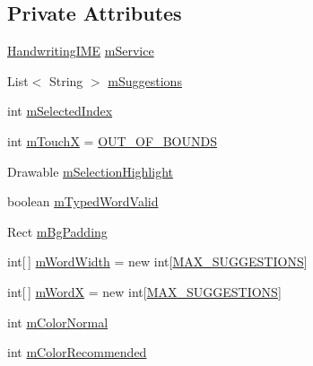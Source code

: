 \subsection*{Private Attributes}
\begin{DoxyCompactItemize}
\item 
\hyperlink{classch_1_1zhaw_1_1ba10__bsha__1_1_1ime_1_1HandwritingIME}{HandwritingIME} \hyperlink{classch_1_1zhaw_1_1ba10__bsha__1_1_1ime_1_1CandidateView_a0d884c9d53fd9e83c4f07227d64d0e4a}{mService}
\item 
List$<$ String $>$ \hyperlink{classch_1_1zhaw_1_1ba10__bsha__1_1_1ime_1_1CandidateView_a3e227667ae0295c1e7f36d55342bc8bd}{mSuggestions}
\item 
int \hyperlink{classch_1_1zhaw_1_1ba10__bsha__1_1_1ime_1_1CandidateView_a056a5bbf219465c88152d1c77a9bfd5d}{mSelectedIndex}
\item 
int \hyperlink{classch_1_1zhaw_1_1ba10__bsha__1_1_1ime_1_1CandidateView_af8a46c24bf29d609f187c805b7e0975c}{mTouchX} = \hyperlink{classch_1_1zhaw_1_1ba10__bsha__1_1_1ime_1_1CandidateView_a9315efa15e2f117b2253fc55d3d1912d}{OUT\_\-OF\_\-BOUNDS}
\item 
Drawable \hyperlink{classch_1_1zhaw_1_1ba10__bsha__1_1_1ime_1_1CandidateView_a4242253fd23317c3e023553f91199268}{mSelectionHighlight}
\item 
boolean \hyperlink{classch_1_1zhaw_1_1ba10__bsha__1_1_1ime_1_1CandidateView_a2283ffd5b861d5fa11e315f499b247f5}{mTypedWordValid}
\item 
Rect \hyperlink{classch_1_1zhaw_1_1ba10__bsha__1_1_1ime_1_1CandidateView_afb3141192119d59855386a531991a9e0}{mBgPadding}
\item 
int\mbox{[}$\,$\mbox{]} \hyperlink{classch_1_1zhaw_1_1ba10__bsha__1_1_1ime_1_1CandidateView_a88507b3d2c0823b5b3ab79799af801a3}{mWordWidth} = new int\mbox{[}\hyperlink{classch_1_1zhaw_1_1ba10__bsha__1_1_1ime_1_1CandidateView_a1eebcf5c70a711c20ae8b828c7177fe4}{MAX\_\-SUGGESTIONS}\mbox{]}
\item 
int\mbox{[}$\,$\mbox{]} \hyperlink{classch_1_1zhaw_1_1ba10__bsha__1_1_1ime_1_1CandidateView_ac4308faba65c9f711d459d494630f8e9}{mWordX} = new int\mbox{[}\hyperlink{classch_1_1zhaw_1_1ba10__bsha__1_1_1ime_1_1CandidateView_a1eebcf5c70a711c20ae8b828c7177fe4}{MAX\_\-SUGGESTIONS}\mbox{]}
\item 
int \hyperlink{classch_1_1zhaw_1_1ba10__bsha__1_1_1ime_1_1CandidateView_a45fdde0e6a7cdb8fb7fbde1ef1c6d30f}{mColorNormal}
\item 
int \hyperlink{classch_1_1zhaw_1_1ba10__bsha__1_1_1ime_1_1CandidateView_a81a1c0185059c585e32c263c6cbdd517}{mColorRecommended}

\end{DoxyCompactItemize}
